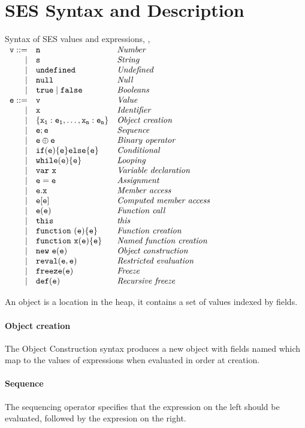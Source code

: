 \documentclass[a4paper]{article}
\begin{document}
\section{SES Syntax and Description}

\newcommand{\editlabel}[3]{~\vg\colorbox{#2}{\textbf{#1:}}\tabfill{\textrm{ #3}}\\}
\newcommand{\FIXME}[1]{\editlabel{FIXME}{red}{#1}}
\newcommand{\TODO}[1]{\editlabel{TODO}{yellow}{#1}}
\newcommand{\COMMENT}[1]{\editlabel{COMMENT}{YellowGreen}{#1}}
\newcommand{\gds}[1]{\editlabel{GDS}{Orange}{#1}}

\newcommand{\syntaxline}[3][\pipe]{#1 & \js{#2} & \textit{#3}\\}
\begin{display}{Syntax of SES values and expressions, , }
  $\begin{array}{rll}
    \syntaxline[\js{v} ::=]{\js{n}}{Number}
    \syntaxline{s}{String}
    \syntaxline{\und}{Undefined}
    \syntaxline{\nil}{Null}
    \syntaxline{\true \pipe \false}{Booleans}
    \syntaxline[\js{e} ::=]{v}{Value}
    \syntaxline{x}{Identifier}
    \syntaxline{\{x_1:e_1, \ldots, x_n:e_n\}}{Object creation}
    \syntaxline{e; e}{Sequence}
    \syntaxline{e \oplus e}{Binary operator}
    \syntaxline{if(e) \{e\} else \{e\}}{Conditional}
    \syntaxline{while(e) \{e\}}{Looping}
    \syntaxline{\jsvar{x}}{Variable declaration}
    \syntaxline{e = e}{Assignment}
    \syntaxline{e.x}{Member access}
    \syntaxline{e[e]}{Computed member access}
    \syntaxline{e(e)}{Function call}
    \syntaxline{this}{this}
    \syntaxline{\jsfun{e}{e}}{Function creation}
    \syntaxline{\jsfun[x]{e}{e}}{Named function creation}
    \syntaxline{\jsnew{e}{e}}{Object construction}
    \syntaxline{reval(e, e)}{Restricted evaluation}
    \syntaxline{freeze(e)}{Freeze}
    \syntaxline{def(e)}{Recursive freeze}
  \end{array}$
\end{display}

An object is a location in the heap, it contains a set of
values indexed by fields.

\paragraph{Object creation}  The Object Construction syntax produces a new object
with fields named  which map to the values of expressions
 when evaluated in order at creation.

\paragraph{Sequence} The sequencing operator specifies that the expression on the left should be
evaluated, followed by the expresion on the right.
\end{document}

